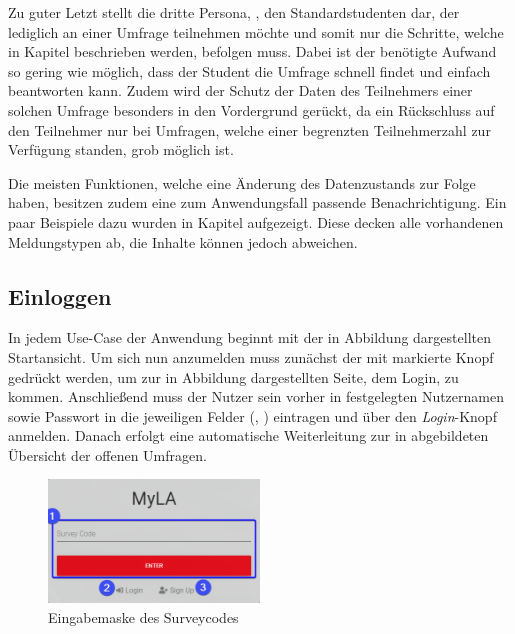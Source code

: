 Zu guter Letzt stellt die dritte Persona, \weigert, den Standardstudenten dar, der lediglich an einer Umfrage teilnehmen möchte und somit nur die Schritte, welche in Kapitel  beschrieben werden, befolgen muss.
Dabei ist der benötigte Aufwand so gering wie möglich, dass der Student die Umfrage schnell findet und einfach beantworten kann.
Zudem wird der Schutz der Daten des Teilnehmers einer solchen Umfrage besonders in den Vordergrund gerückt, da ein Rückschluss auf den Teilnehmer nur bei Umfragen, welche einer begrenzten Teilnehmerzahl zur Verfügung standen, grob möglich ist.

Die meisten Funktionen, welche eine Änderung des Datenzustands zur Folge haben, besitzen zudem eine zum Anwendungsfall passende Benachrichtigung.
Ein paar Beispiele dazu wurden in Kapitel  aufgezeigt.
Diese decken alle vorhandenen Meldungstypen ab, die Inhalte können jedoch abweichen.

\subsection{Einloggen}
\label{ssec:Einloggen}

In jedem Use-Case der Anwendung beginnt mit der in Abbildung  dargestellten Startansicht.
Um sich nun anzumelden muss zunächst der mit \desTwo markierte Knopf gedrückt werden, um zur in Abbildung  dargestellten Seite, dem Login, zu kommen.
Anschließend muss der Nutzer sein vorher in  festgelegten Nutzernamen sowie Passwort in die jeweiligen Felder (\desOne, \desTwo) eintragen und über den \emph{Login}-Knopf anmelden.
Danach erfolgt eine automatische Weiterleitung zur in  abgebildeten Übersicht der offenen Umfragen.

\begin{figure}[H]
	\centering
	\includegraphics[width=0.5\textwidth, keepaspectratio]{img/guide/SurveyCode.png}
	\captionsetup{justification=centering, format=plain}
	\caption[Eingabemaske Surveycode]{Eingabemaske des Surveycodes \\\quelleScreenshot}
	\label{fig:EingabemaskeSurveycode}
\end{figure}

